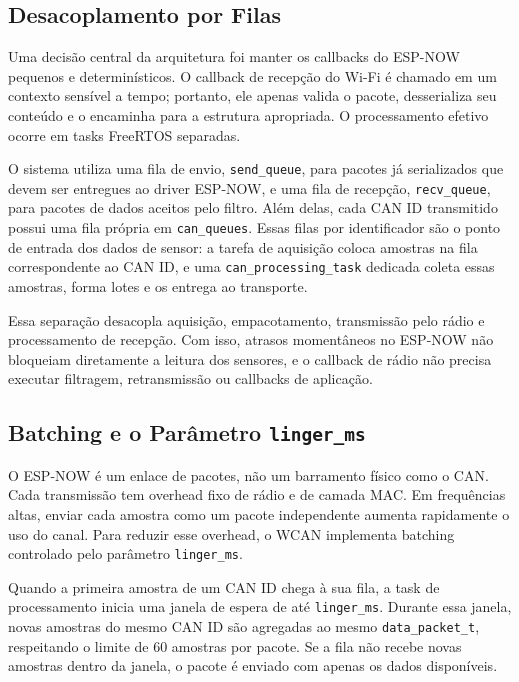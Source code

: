 \documentclass{article}
\begin{document}
    \subsection{Desacoplamento por Filas}

    Uma decisão central da arquitetura foi manter os callbacks do ESP-NOW pequenos e determinísticos. O callback de recepção do Wi-Fi é chamado em um contexto sensível a tempo; portanto, ele apenas valida o pacote, desserializa seu conteúdo e o encaminha para a estrutura apropriada. O processamento efetivo ocorre em tasks FreeRTOS separadas.

    O sistema utiliza uma fila de envio, \texttt{send_queue}, para pacotes já serializados que devem ser entregues ao driver ESP-NOW, e uma fila de recepção, \texttt{recv_queue}, para pacotes de dados aceitos pelo filtro. Além delas, cada CAN ID transmitido possui uma fila própria em \texttt{can_queues}. Essas filas por identificador são o ponto de entrada dos dados de sensor: a tarefa de aquisição coloca amostras na fila correspondente ao CAN ID, e uma \texttt{can_processing_task} dedicada coleta essas amostras, forma lotes e os entrega ao transporte.

    Essa separação desacopla aquisição, empacotamento, transmissão pelo rádio e processamento de recepção. Com isso, atrasos momentâneos no ESP-NOW não bloqueiam diretamente a leitura dos sensores, e o callback de rádio não precisa executar filtragem, retransmissão ou callbacks de aplicação.

    \subsection{Batching e o Parâmetro \texttt{linger_ms}}

    O ESP-NOW é um enlace de pacotes, não um barramento físico como o CAN. Cada transmissão tem overhead fixo de rádio e de camada MAC. Em frequências altas, enviar cada amostra como um pacote independente aumenta rapidamente o uso do canal. Para reduzir esse overhead, o WCAN implementa batching controlado pelo parâmetro \texttt{linger_ms}.

    Quando a primeira amostra de um CAN ID chega à sua fila, a task de processamento inicia uma janela de espera de até \texttt{linger_ms}. Durante essa janela, novas amostras do mesmo CAN ID são agregadas ao mesmo \texttt{data_packet_t}, respeitando o limite de 60 amostras por pacote. Se a fila não recebe novas amostras dentro da janela, o pacote é enviado com apenas os dados disponíveis.
\end{document}
